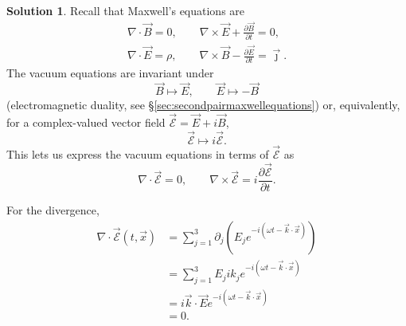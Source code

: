 \documentclass[11pt, a4paper]{report}
\theoremstyle{definition}
\newtheorem{solution}{Solution}[part]
\newenvironment{sol}{\begin{solution}}{\end{solution}\pagebreak[3]}
\begin{document}
\begin{sol}

Recall that Maxwell's equations are
\begin{gather*}
    \nabla \cdot \vec{B} = 0, \qquad
    \nabla \times \vec{E} + \frac{\partial \vec{B}}{\partial t} = 0, \\
    \nabla \cdot \vec{E} = \rho, \qquad
    \nabla \times \vec{B} - \frac{\partial \vec{E}}{\partial t} = \vec{\jmath}.
\end{gather*}
The vacuum equations are invariant under
\[
    \vec{B} \mapsto \vec{E}, \qquad
    \vec{E} \mapsto - \vec{B}
\]
(electromagnetic duality, see \S\ref{sec:secondpairmaxwellequations}) or, equivalently, for a complex-valued vector field $\vec{\mathcal{E}} = \vec{E} + i \vec{B}$,
\[
    \vec{\mathcal{E}} \mapsto i \vec{\mathcal{E}}.
\]
This lets us express the vacuum equations in terms of $\vec{\mathcal{E}}$ as
\[
    \nabla \cdot \vec{\mathcal{E}} = 0, \qquad
    \nabla \times \vec{\mathcal{E}} = i \frac{\partial \vec{\mathcal{E}}}{\partial t}.
\]

For the divergence,
\begin{align*}
    \nabla \cdot \vec{\mathcal{E}}(t, \vec{x})
        &= \sum_{j = 1}^3 \partial_j \left( E_j  e^{-i(\omega t - \vec{k} \cdot \vec{x})} \right) \\
        &= \sum_{j = 1}^3 E_j i k_j e^{-i(\omega t - \vec{k} \cdot \vec{x})} \\
        &= i \vec{k} \cdot \vec{E} e^{-i(\omega t - \vec{k} \cdot \vec{x})} \\
        &= 0.
\end{align*}


\end{sol}
\end{document}
